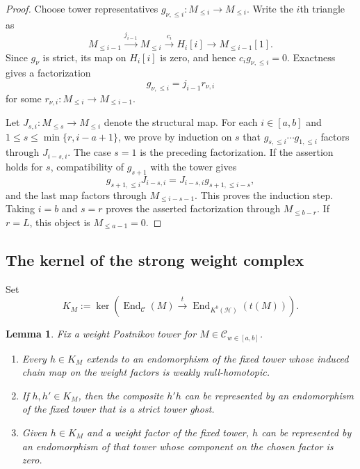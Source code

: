 \documentclass[11pt]{amsart}
\numberwithin{equation}{section}
\newtheorem{lemma}[theorem]{Lemma}
\theoremstyle{definition}
\theoremstyle{remark}
\DeclareMathOperator{\End}{End}
\newcommand{\C}{\mathcal C}
\newcommand{\Hh}{\mathcal H}
\begin{document}
\begin{proof}
Choose tower representatives
$g_{\nu,\le i}\colon M_{\le i}\to M_{\le i}$.  Write the $i$th triangle as
\[
  M_{\le i-1}\xrightarrow{j_{i-1}}M_{\le i}
  \xrightarrow{c_i}H_i[i]\longrightarrow M_{\le i-1}[1].
\]
Since $g_\nu$ is strict, its map on $H_i[i]$ is zero, and hence
$c_i g_{\nu,\le i}=0$.  Exactness gives a factorization
\[
  g_{\nu,\le i}=j_{i-1}r_{\nu,i}
\]
for some $r_{\nu,i}\colon M_{\le i}\to M_{\le i-1}$.

Let $J_{s,i}\colon M_{\le s}\to M_{\le i}$ denote the structural map.  For
each $i\in[a,b]$ and $1\le s\le\min\{r,i-a+1\}$, we prove by induction on
$s$ that
$g_{s,\le i}\cdots g_{1,\le i}$ factors through $J_{i-s,i}$.  The case
$s=1$ is the preceding factorization.  If the assertion holds for $s$,
compatibility of $g_{s+1}$ with the tower gives
\[
  g_{s+1,\le i}J_{i-s,i}
  =J_{i-s,i}g_{s+1,\le i-s},
\]
and the last map factors through $M_{\le i-s-1}$.  This proves the induction
step.  Taking $i=b$ and $s=r$ proves the asserted factorization through
$M_{\le b-r}$.  If $r=L$, this object is $M_{\le a-1}=0$.
\end{proof}

\subsection{The kernel of the strong weight complex}

Set
\[
  K_M:=\ker\!\left(
  \End_{\C}(M)\xrightarrow{\ t\ }
  \End_{K^b(\Hh)}(t(M))
  \right).
\]

\begin{lemma}
\label{lem:strictification}
Fix a weight Postnikov tower for $M\in\C_{w\in[a,b]}$.
\begin{enumerate}[label=\textup{(\roman*)}]
\item Every $h\in K_M$ extends to an endomorphism of the fixed tower whose
induced chain map on the weight factors is weakly null-homotopic.
\item If $h,h'\in K_M$, then the composite $h'h$ can be represented by an
endomorphism of the fixed tower that is a strict tower ghost.
\item Given $h\in K_M$ and a weight factor of the fixed tower, $h$ can be
represented by an endomorphism of that tower whose component on the chosen
factor is zero.
\end{enumerate}
\end{lemma}
\end{document}
